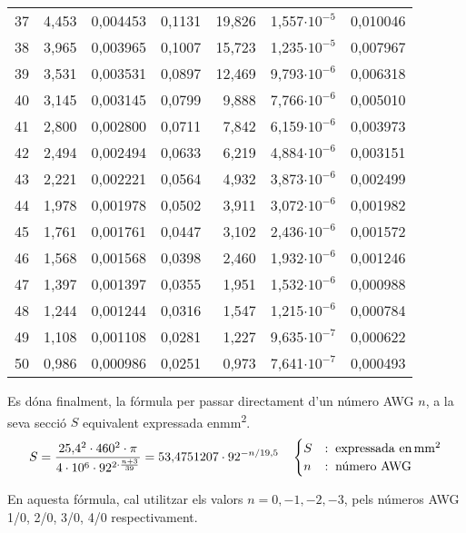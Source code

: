 \begin{longtable}{crrrrrr}
37 &      4,453 &   0,004453 &     0,1131 &     19,826 &  1,557$\cdot 10^{-5}$ &   0,010046 \\
38 &      3,965 &   0,003965 &     0,1007 &     15,723 &  1,235$\cdot 10^{-5}$ &   0,007967 \\
39 &      3,531 &   0,003531 &     0,0897 &     12,469 &  9,793$\cdot 10^{-6}$ &   0,006318 \\
40 &      3,145 &   0,003145 &     0,0799 &      9,888 &  7,766$\cdot 10^{-6}$ &   0,005010 \\
41 &      2,800 &   0,002800 &     0,0711 &      7,842 &  6,159$\cdot 10^{-6}$ &   0,003973 \\
42 &      2,494 &   0,002494 &     0,0633 &      6,219 &  4,884$\cdot 10^{-6}$ &   0,003151 \\
43 &      2,221 &   0,002221 &     0,0564 &      4,932 &  3,873$\cdot 10^{-6}$ &   0,002499 \\
44 &      1,978 &   0,001978 &     0,0502 &      3,911 &  3,072$\cdot 10^{-6}$ &   0,001982 \\
45 &      1,761 &   0,001761 &     0,0447 &      3,102 &  2,436$\cdot 10^{-6}$ &   0,001572 \\
46 &      1,568 &   0,001568 &     0,0398 &      2,460 &  1,932$\cdot 10^{-6}$ &   0,001246 \\
47 &      1,397 &   0,001397 &     0,0355 &      1,951 &  1,532$\cdot 10^{-6}$ &   0,000988 \\
48 &      1,244 &   0,001244 &     0,0316 &      1,547 &  1,215$\cdot 10^{-6}$ &   0,000784 \\
49 &      1,108 &   0,001108 &     0,0281 &      1,227 &  9,635$\cdot 10^{-7}$ &   0,000622 \\
50 &      0,986 &   0,000986 &     0,0251 &      0,973 &  7,641$\cdot 10^{-7}$ &   0,000493 \\
\bottomrule[1pt]
\end{longtable}

 Es d\'{o}na finalment, la f\'{o}rmula per passar directament d'un n\'{u}mero AWG $n$, a la seva secci\'{o} $S$ equivalent expressada en\unit{mm^2}.
\begin{equation}
   S = \frac{25{,}4^2 \cdot 460^2 \cdot \pi}{4 \cdot 10^6 \cdot 92^{2\cdot\frac{n+3}{39}}} =
   53{,}4751207 \cdot 92^{-n/19{,}5} \quad
\begin{cases}
   S &:\; \text{expressada en\ensuremath{\mathrm{\,mm^2}}} \\
   n &:\; \text{n\'{u}mero AWG}
\end{cases}
\end{equation}

En aquesta f\'{o}rmula, cal utilitzar els valors $n = 0, -1, -2, -3$,  pels n\'{u}meros AWG 1/0,
2/0, 3/0, 4/0 respectivament.
